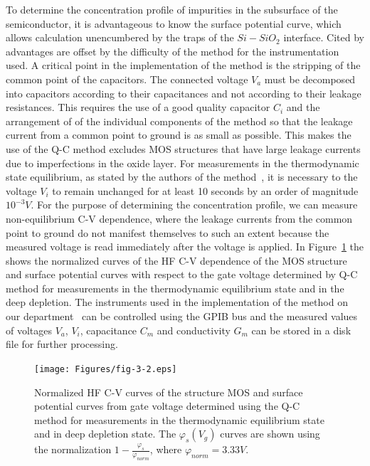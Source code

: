 To determine the concentration profile of impurities in the subsurface
of the semiconductor, it is advantageous to know the surface potential
curve, which allows calculation unencumbered by the traps of the
$Si-SiO_2$ interface. Cited by advantages are offset by the difficulty
of the method for the instrumentation used.  A critical point in the
implementation of the method is the stripping of the common point of
the capacitors. The connected voltage $V_a$ must be decomposed into
capacitors according to their capacitances and not according to their
leakage resistances.  This requires the use of a good quality
capacitor $C_i$ and the arrangement of of the individual components of
the method so that the leakage current from a common point to ground
is as small as possible. This makes the use of the Q-C method excludes
MOS structures that have large leakage currents due to imperfections
in the oxide layer. For measurements in the thermodynamic state
equilibrium, as stated by the authors of the method~\cite{3.7}, it is
necessary to the voltage $V_i$ to remain unchanged for at least 10
seconds by an order of magnitude $10^{-3}V$. For the purpose of
determining the concentration profile, we can measure non-equilibrium
C-V dependence, where the leakage currents from the common point to
ground do not manifest themselves to such an extent because the
measured voltage is read immediately after the voltage is applied. In
Figure~\ref{fig:3.2} the shows the normalized curves of the HF C-V
dependence of the MOS structure and surface potential curves with
respect to the gate voltage determined by Q-C method for measurements
in the thermodynamic equilibrium state and in the deep depletion. The
instruments used in the implementation of the method on our
department~\cite{3.8,3.9} can be controlled using the GPIB bus and
the measured values of voltages $V_a$, $V_i$, capacitance $C_m$ and
conductivity $G_m$ can be stored in a disk file for further
processing.

\begin{figure}[h!]\centering
\texttt{[image: Figures/fig-3-2.eps]}
\caption[Normalized curves HF C-V dependence of MOS structure and curve
  surface potential versus gate voltage determined using the Q-C method
  for measurements in thermodynamic equilibrium and deep
  depletion]{Normalized HF C-V curves of the structure
  MOS and surface potential curves from gate voltage determined
  using the Q-C method for measurements in the thermodynamic equilibrium state and in
  deep depletion state. The $\varphi_s(V_g)$ curves are shown
  using the normalization $1-\frac{\varphi_s}{\varphi_{norm}}$, where
  $\varphi_{norm}=3.33V$.}\label{fig:3.2}
\end{figure}

